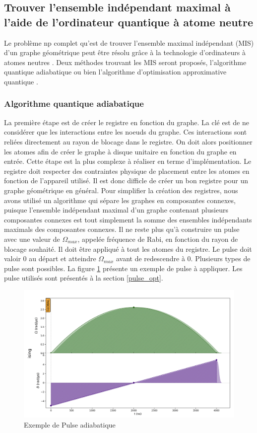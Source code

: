 \documentclass[11pt]{article}
\begin{document}
\subsection{Trouver l'ensemble indépendant maximal à l'aide de l'ordinateur quantique à atome neutre}
Le problème np complet \cite{tarjan_finding_1977} qu'est de trouver l'ensemble maximal indépendant (MIS) d'un graphe géométrique peut être résolu grâce à la technologie d'ordinateurs à atomes neutres \cite{dettmann_random_2016}. Deux méthodes trouvant les MIS seront proposés, l'algorithme quantique adiabatique ou bien l'algorithme d'optimisation approximative quantique \cite{ebadi_quantum_2022}.

\subsubsection{Algorithme quantique adiabatique}
La première étape est de créer le registre en fonction du graphe. La clé est de ne considérer que les interactions entre les noeuds du graphe. Ces interactions sont reliées directement au rayon de blocage dans le registre. On doit alors positionner les atomes afin de créer le graphe à disque unitaire en fonction du graphe en entrée. Cette étape est la plus complexe à réaliser en terme d'implémentation. Le registre doit respecter des contraintes physique de placement entre les atomes en fonction de l'appareil utilisé. Il est donc difficle de créer un bon registre pour un graphe géométrique en général. Pour simplifier la création des registres, nous avons utilisé un algorithme qui sépare les graphes en composantes connexes, puisque l'ensemble indépendant maximal d'un graphe contenant plusieurs composantes connexes est tout simplement la somme des ensembles indépendants maximals des composantes connexes. Il ne reste plus qu'à construire un pulse avec une valeur de $\Omega_{max}$, appelée fréquence de Rabi, en fonction du rayon de blocage souhaité. Il doit être appliqué à tout les atomes du registre. Le pulse doit valoir 0 au départ et atteindre $\Omega_{max}$ avant de redescendre à 0. Plusieurs types de pulse sont possibles. La figure \ref{pulse_exemple} présente un exemple de pulse à appliquer. Les pulse utilisés sont présentés à la section \ref{pulse_opt}.
\begin{figure}[H]
    \centering
    \includegraphics[width = 0.6\linewidth]{images/pulse_exemple.png}
    \caption{Exemple de Pulse adiabatique}
    \label{pulse_exemple}
\end{figure}
\end{document}
